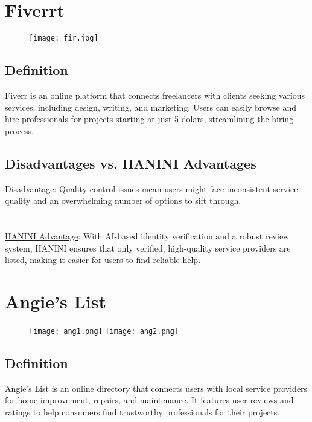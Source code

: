 \documentclass[12pt,a4paper]{report}
\begin{document}
\section{Fiverrt}
\begin{figure}[ht]
    \begin{center}
        \texttt{[image: fir.jpg]}
         
     \end{center}
\end{figure}
\subsection*{Definition}
Fiverr is an online platform that connects freelancers with clients seeking various services, including design, writing, and marketing. Users can easily browse and hire professionals for projects starting at just 5 dolars, streamlining the hiring process.
\subsection*{Disadvantages vs. HANINI Advantages}
\underline {Disadvantage}: Quality control issues mean users might face inconsistent service quality and an overwhelming number of options to sift through.\\
\textbf{                      }\\
\textbf{                      }\\
\underline {HANINI Advantage}:  With AI-based identity verification and a robust review system, HANINI ensures that only verified, high-quality service providers are listed, making it easier for users to find reliable help.


\section{Angie’s List}
\begin{figure}[ht]
    \begin{center}
        \texttt{[image: ang1.png]}
         \texttt{[image: ang2.png]}
     \end{center}
\end{figure}
\subsection*{Definition}
Angie’s List is an online directory that connects users with local service providers for home improvement, repairs, and maintenance. It features user reviews and ratings to help consumers find trustworthy professionals for their projects.
\end{document}
